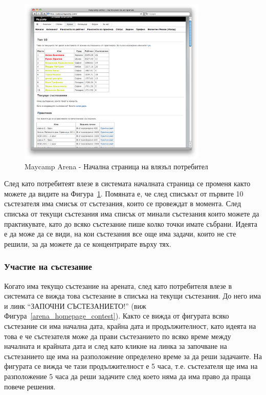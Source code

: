 \documentclass[a4paper,12pt]{article}
\begin{document}
  \begin{figure}[ht]
    \begin{center}
      \includegraphics[width=0.8\textwidth]{maycamp_arena_home_logged.png}
    \end{center}
    \caption{Maycamp Arena - Начална страница на влязъл потребител}
    \label{arena_homepage_logged}
  \end{figure}
  След като потребитеят влезе в системата началната страница се променя както можете да видите на Фигура~\ref{arena_homepage_logged}. Помяната е, че след списъкът от първите 10 състезателя има смисък от състезания, които се провеждат в момента. След списъка от текущи състезания има списък от минали състезания които можете да практикувате, като до всяко състезание пише колко точки имате събрани. Идеята е да може да се види, на кои състезания все още има задачи, които не сте решили, за да можете да се концентрирате върху тях.

  \subsubsection{Участие на състезание}
  Когато има текущо състезание на арената, след като потребителя влезе в системата се вижда това състезание в списъка на текущи състезания. До него има и линк ``ЗАПОЧНИ СЪСТЕЗАНИЕТО!'' (виж Фигура~\ref{arena_homepage_contest}). Както се вижда от фигурата всяко състезание си има начална дата, крайна дата и продължителност, като идеята на това е че състезателя може да прави състезанието по всяко време между началната и крайната дата и след като кликне на линка за започване на състезанието ще има на разположение определено време за да реши задачаите. На фигурата се вижда че тази продължителност е 5 часа, т.е. състезателя ще има на разположение 5 часа да реши задачите след което няма да има право да праща повече решения.
  
\end{document}
